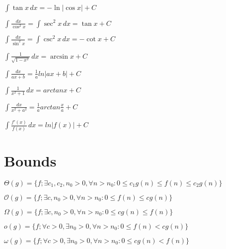 \documentclass[a4paper]{article}
\begin{document}
\begin{multicols*}{2}
{\begin{center}
\begin{small}
\begin{compactenum}
\begin{math}
            \end{math}
            \item \begin{math}
                \int \tan{x} \, dx = -\ln{\left| \cos {x} \right|} + C
            \end{math}
            \item \begin{math}
                \int \frac{dx}{\cos^2 x}=\int \sec^2 x \, dx = \tan x + C
            \end{math}
            \item \begin{math}
                \int \frac{dx}{\sin^2 x}=\int \csc^2 x \, dx = -\cot x + C
            \end{math}
            \item \begin{math}
                \int {\frac{1}{\sqrt{1-x^2}}} \, dx = \arcsin {x} + C
            \end{math}
            \item \begin{math}
                \int \frac{dx}{ax + b} = \frac{1}{a} ln |ax + b| + C
            \end{math}
            \item \begin{math}
                \int \frac{1}{x^2 + 1} \, dx = arctan x + C
            \end{math}
            \item \begin{math}
                \int \frac{dx}{x^2 + a^2} = \frac{1}{a} arctan \frac{x}{a} + C
            \end{math}
            \item \begin{math}
                \int \frac{f'(x)}{f(x)} \, dx = ln|f(x)| + C
            \end{math}
        \end{compactenum}
    \end{small}
\end{center}

\section{Bounds}
\begin{compactitem}
    \item $\Theta(g) = \{f; \exists c_1,c_2,n_0>0, \forall n>n_0: 0 \leq c_1g(n)\leq f(n) \leq c_2g(n)\}$
	\item $\mathcal{O}(g) = \{f; \exists c,n_0>0, \forall n>n_0: 0 \leq f(n) \leq cg(n)\}$
	\item $\Omega(g) = \{f; \exists c,n_0>0, \forall n>n_0: 0 \leq cg(n) \leq f(n)\}$
	\item $o(g) = \{f;\forall c>0,\exists n_0>0,\forall n > n_0: 0 \leq f(n) < cg(n)\}$
	\item $\omega(g) = \{f;\forall c>0,\exists n_0>0,\forall n > n_0: 0 \leq cg(n) < f(n)\}$
\end{compactitem}


}
\end{multicols*}
\end{document}
